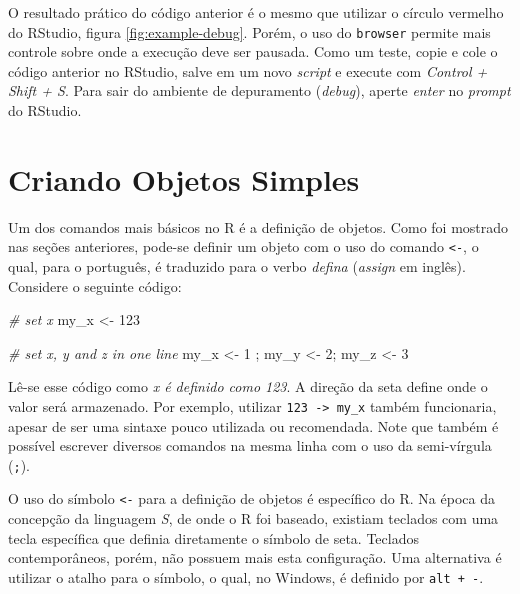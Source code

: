 \documentclass[
  11pt,
]{book}
\newenvironment{Shaded}{\begin{snugshade}}{\end{snugshade}}
\newcommand{\CommentTok}[1]{\textcolor[rgb]{0.37,0.37,0.37}{\textit{#1}}}
\newcommand{\DecValTok}[1]{\textcolor[rgb]{0.06,0.06,0.06}{#1}}
\newcommand{\NormalTok}[1]{#1}
\newcommand{\OtherTok}[1]{\textcolor[rgb]{0.37,0.37,0.37}{#1}}
\newenvironment{rmdimportant}
{\begin{importantblock}

	} {\end{importantblock}}
\begin{document}
O resultado prático do código anterior é o mesmo que utilizar o círculo vermelho do RStudio, figura \ref{fig:example-debug}. Porém, o uso do \texttt{browser} permite mais controle sobre onde a execução deve ser pausada. Como um teste, copie e cole o código anterior no RStudio, salve em um novo \emph{script} e execute com \emph{Control + Shift + S}. Para sair do ambiente de depuramento (\emph{debug}), aperte \emph{enter} no \emph{prompt} do RStudio. 

\hypertarget{criando-objetos-simples}{%
\section{Criando Objetos Simples}\label{criando-objetos-simples}}

Um dos comandos mais básicos no R é a definição de objetos. Como foi mostrado nas seções anteriores, pode-se definir um objeto com o uso do comando \texttt{\textless{}-}, o qual, para o português, é traduzido para o verbo \emph{defina} (\emph{assign} em inglês). Considere o seguinte código:

\begin{Shaded}
\begin{Highlighting}[]
\CommentTok{\# set x}
\NormalTok{my\_x }\OtherTok{\textless{}{-}} \DecValTok{123}

\CommentTok{\# set x, y and z in one line}
\NormalTok{my\_x }\OtherTok{\textless{}{-}} \DecValTok{1}\NormalTok{ ; my\_y }\OtherTok{\textless{}{-}} \DecValTok{2}\NormalTok{; my\_z }\OtherTok{\textless{}{-}} \DecValTok{3}
\end{Highlighting}
\end{Shaded}

Lê-se esse código como \emph{x é definido como 123}. A direção da seta define onde o valor será armazenado. Por exemplo, utilizar \texttt{123\ -\textgreater{}\ my\_x} também funcionaria, apesar de ser uma sintaxe pouco utilizada ou recomendada. Note que também é possível escrever diversos comandos na mesma linha com o uso da semi-vírgula (\texttt{;}).

\begin{rmdimportant}
O uso do símbolo \texttt{\textless{}-} para a definição de objetos é
específico do R. Na época da concepção da linguagem \emph{S}, de onde o
R foi baseado, existiam teclados com uma tecla específica que definia
diretamente o símbolo de seta. Teclados contemporâneos, porém, não
possuem mais esta configuração. Uma alternativa é utilizar o atalho para
o símbolo, o qual, no Windows, é definido por \texttt{alt\ +\ -}.
\end{rmdimportant}
\end{document}
